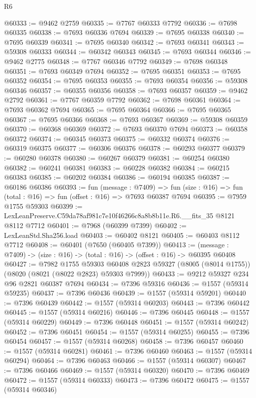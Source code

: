 \begin{lexlean}{R6}
\begin{coremodule}
@60333 := @9462 @2759
@60335 := @7767 @60333 @7792
@60336 := @7698 @60335
@60338 := @7693 @60336 @7694
@60339 := @7695 @60338
@60340 := @7695 @60339
@60341 := @7695 @60340
@60342 := @7693 @60341
@60343 := @59308 @60333
@60344 := @60342 @60343
@60345 := @7693 @60344
@60346 := @9462 @2775
@60348 := @7767 @60346 @7792
@60349 := @7698 @60348
@60351 := @7693 @60349 @7694
@60352 := @7695 @60351
@60353 := @7695 @60352
@60354 := @7695 @60353
@60355 := @7693 @60354
@60356 := @59308 @60346
@60357 := @60355 @60356
@60358 := @7693 @60357
@60359 := @9462 @2792
@60361 := @7767 @60359 @7792
@60362 := @7698 @60361
@60364 := @7693 @60362 @7694
@60365 := @7695 @60364
@60366 := @7695 @60365
@60367 := @7695 @60366
@60368 := @7693 @60367
@60369 := @59308 @60359
@60370 := @60368 @60369
@60372 := @7693 @60370 @7694
@60373 := @60358 @60372
@60374 := @60345 @60373
@60375 := @60332 @60374
@60376 := @60319 @60375
@60377 := @60306 @60376
@60378 := @60293 @60377
@60379 := @60280 @60378
@60380 := @60267 @60379
@60381 := @60254 @60380
@60382 := @60241 @60381
@60383 := @60228 @60382
@60384 := @60215 @60383
@60385 := @60202 @60384
@60386 := @60194 @60385
@60387 := @60186 @60386
@60393 := fun (message : @7409) =>
  fun (size : @16) => fun (total : @16) => fun (offset : @16) => @7693 @60387 @7694
@60395 := @7959 @1755 @59303
@60399 := LexLeanPreserve.C59da78af981c7e10f46266c8a8b8b11e.R6.__fits_35 @8121 @8112 @7712
@60401 := @7968 (@60399 @7399)
@60402 := LexLeanStd.Sha256.load
@60403 := @60402 @8121
@60405 := @60403 @8112 @7712
@60408 := @60401 (@7650 (@60405 @7399))
@60413 := (message : @7409) -> (size : @16) -> (total : @16) -> (offset : @16) -> @60395 @60408
@60427 := @7982
    @1755
    @59303
    @60408
    @2823
    @59327
    (@8005 (@8014 @1755))
    (@8020 (@8021 (@8022 @2823) @59303 @7999))
@60433 := @9212 @59327 @234 @96 @2821 @60387 @7694
@60434 := @7396 @59316
@60436 := @1557 (@59314 @59235)
@60437 := @7396 @60436
@60439 := @1557 (@59314 @59201)
@60440 := @7396 @60439
@60442 := @1557 (@59314 @60203)
@60443 := @7396 @60442
@60445 := @1557 (@59314 @60216)
@60446 := @7396 @60445
@60448 := @1557 (@59314 @60229)
@60449 := @7396 @60448
@60451 := @1557 (@59314 @60242)
@60452 := @7396 @60451
@60454 := @1557 (@59314 @60255)
@60455 := @7396 @60454
@60457 := @1557 (@59314 @60268)
@60458 := @7396 @60457
@60460 := @1557 (@59314 @60281)
@60461 := @7396 @60460
@60463 := @1557 (@59314 @60294)
@60464 := @7396 @60463
@60466 := @1557 (@59314 @60307)
@60467 := @7396 @60466
@60469 := @1557 (@59314 @60320)
@60470 := @7396 @60469
@60472 := @1557 (@59314 @60333)
@60473 := @7396 @60472
@60475 := @1557 (@59314 @60346)

\end{coremodule}
\end{lexlean}
